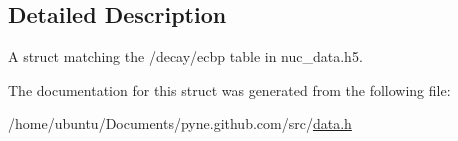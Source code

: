 \subsection{Detailed Description}
A struct matching the \textquotesingle{}/decay/ecbp\textquotesingle{} table in nuc\+\_\+data.\+h5. 

The documentation for this struct was generated from the following file\+:\begin{DoxyCompactItemize}
\item 
/home/ubuntu/\+Documents/pyne.\+github.\+com/src/\hyperlink{data_8h}{data.\+h}\end{DoxyCompactItemize}
